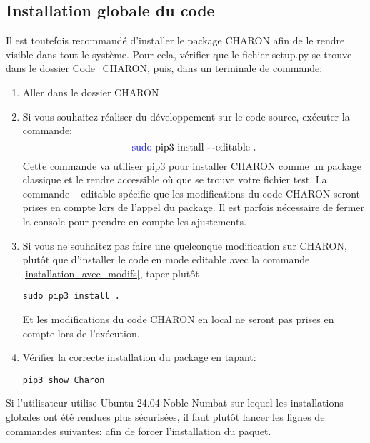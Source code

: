 \documentclass[10pt]{book}
\begin{document}
\subsection{Installation globale du code}
Il est toutefois recommandé d'installer le package CHARON afin de le rendre visible dans tout le système. Pour cela, vérifier que le fichier setup.py se trouve dans le dossier Code\_CHARON, puis, dans un terminale de commande:
\begin{enumerate}
\item Aller dans le dossier CHARON
\item Si vous souhaitez réaliser du développement sur le code source, exécuter la commande:
\begin{equation}
\text{\blue{sudo} pip3 install -\,-editable .}
\label{installation_avec_modifs}
\end{equation}
Cette commande va utiliser pip3 pour installer CHARON comme un package classique et le rendre accessible où que se trouve votre fichier test.
La commande -\,-editable spécifie que les modifications du code CHARON seront prises en compte lors de l'appel du package. Il est parfois nécessaire de fermer la console pour prendre en compte les ajustements.
\item Si vous ne souhaitez pas faire une quelconque modification sur CHARON, plutôt que d'installer le code en mode \og editable \fg{} avec la commande \eqref{installation_avec_modifs}, taper plutôt
\begin{verbatim}
sudo pip3 install .
\end{verbatim}
Et les modifications du code CHARON en local ne seront pas prises en compte lors de l’exécution.
\item Vérifier la correcte installation du package en tapant:
\begin{verbatim}
pip3 show Charon
\end{verbatim}
\end{enumerate}
\begin{Rem}{
Si l'utilisateur utilise Ubuntu 24.04 Noble Numbat sur lequel les installations globales ont été rendues plus sécurisées, il faut plutôt lancer les lignes de commandes suivantes:
afin de forcer l'installation du paquet.
}\end{Rem}
\end{document}

